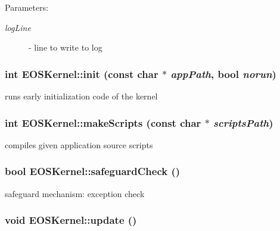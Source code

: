 \begin{Desc}
\item[Parameters:]
\begin{description}
\item[{\em logLine}]- line to write to log \end{description}
\end{Desc}
\hypertarget{structEOSKernel_04741bac06a4289eeaa252290c9ea48f}{
\subsubsection[{init}]{\setlength{\rightskip}{0pt plus 5cm}int EOSKernel::init (const char $\ast$ {\em appPath}, \/  bool {\em norun})}}
\label{structEOSKernel_04741bac06a4289eeaa252290c9ea48f}


runs early initialization code of the kernel 

\hypertarget{structEOSKernel_d6091282d486d45fe2c243510031ad32}{
\subsubsection[{makeScripts}]{\setlength{\rightskip}{0pt plus 5cm}int EOSKernel::makeScripts (const char $\ast$ {\em scriptsPath})}}
\label{structEOSKernel_d6091282d486d45fe2c243510031ad32}


compiles given application source scripts 

\hypertarget{structEOSKernel_13844b7aae15bf38e0ceca3a5be52b9b}{
\subsubsection[{safeguardCheck}]{\setlength{\rightskip}{0pt plus 5cm}bool EOSKernel::safeguardCheck ()}}
\label{structEOSKernel_13844b7aae15bf38e0ceca3a5be52b9b}


safeguard mechanism: exception check 

\hypertarget{structEOSKernel_29d304241dfe47c34d782b0b93a6b986}{
\subsubsection[{update}]{\setlength{\rightskip}{0pt plus 5cm}void EOSKernel::update ()}}
\label{structEOSKernel_29d304241dfe47c34d782b0b93a6b986}


